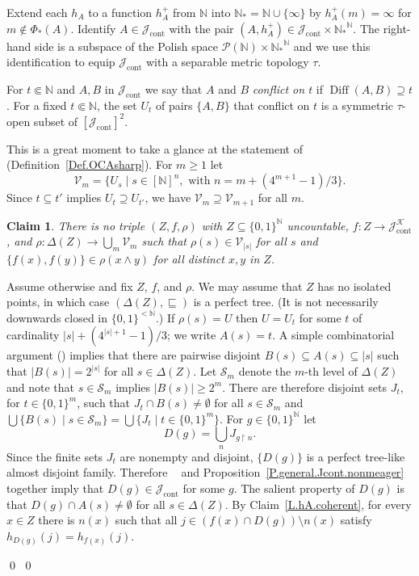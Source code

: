 \documentclass{amsart}
\makeatletter
\def\N{\mathbb N}                        %
\def\rs{\restriction}
\def\text{\mbox}
\newtheorem{claim}{Claim}
\theoremstyle{definition}
\theoremstyle{remark}
\def\twolo{\{0,1\}^{<\N}}
\def\twoo{\{0,1\}^{\N}}
\DeclareMathOperator{\Ccont}{cont}
\newcommand{\Jcont}{\cJ_{\Ccont}}
\newcommand{\cK}{{\mathcal K}}
\renewcommand{\proofname}{Proof}
\renewenvironment{proof}[1][\proofname]{\par
\let\oldqedsymbol\qedsymbol             %
  \normalfont
  \topsep6\p@\@plus6\p@ \trivlist
  \item[\hskip\labelsep\hskip\parindent\scshape
    #1\@addpunct{.}]\ignorespaces
}{%
  \qed\endtrivlist
\global\let\qedsymbol\oldqedsymbol      %
}
\newcommand{\cP}{\mathcal P}
\newcommand{\bbN}{\mathbb N}
\newcommand{\cJ}{{\mathcal J}} %
\newcommand{\cV}{\mathcal V}
\DeclareMathOperator{\OCAT}{OCA_T}
\DeclareMathOperator{\OCAsharp}{OCA^\#}
\newcommand{\cS}{\mathcal S}
\DeclareMathOperator{\Diff}{Diff}
\numberwithin{claim}{subsection}
\makeatother
\begin{document}
\begin{proof}[Proof of Theorem~\ref{T.OCAsharp-Fin}]
	
	Extend each $h_A$ to a function $h_A^+$ from $\bbN$ into $\bbN_*=\bbN\cup \{\infty\}$ by $h_A^+(m)=\infty$ for $m\notin \Phi_*(A)$. 
	Identify $A\in \Jcont$ with the pair $(A,h_A^+)\in\Jcont\times {\bbN_*}^\bbN$. The right-hand side is a subspace of the Polish space $\cP(\bbN)\times {\bbN_*}^\bbN$ and we use this identification to equip $\Jcont$ with a separable metric topology $\tau$. 
	
	
	For $t\Subset \bbN$ and $A,B$ in $\Jcont$ we say that $A$ and $B$ \emph{conflict on $t$} if $\Diff(A,B)\supseteq t$. For a fixed $t\Subset \bbN$, the set $U_t$ of pairs $\{A,B\}$ that conflict on $t$ is a symmetric $\tau$-open subset of $[\Jcont]^2$. 
	
This is a great moment to take a glance at the statement of $\OCAsharp$ (Definition~\ref{Def.OCAsharp}).
	For $m\geq 1$ let 
	\[
	\cV_m=\{U_s\mid s\in [\bbN]^{n}, \text{ with } n=m+(4^{m+1}-1)/3\}.
	\]  
	Since $t\subseteq t'$ implies $U_t\supseteq U_{t'}$, we have $\cV_m\supseteq \cV_{m+1}$ for all $m$. 
	
	
	\begin{claim}\label{C.no-triple}
		There is no triple $(Z,f,\rho)$ with $Z\subseteq \twoo$ uncountable, $f\colon Z\to \Jcont^\cK$,  and $\rho\colon \Delta(Z)\to \bigcup_m \cV_m$ such that $\rho(s)\in \cV_{|s|}$ for all $s$ and 
		\(
		\{f(x),f(y)\}\in \rho(x\wedge y)
		\)
		for all distinct $x,y$ in $Z$. 
	\end{claim}
	\begin{proof}
		Assume otherwise and fix $Z$, $f$, and $\rho$.  We may assume that $Z$ has no isolated points, in which case $(\Delta(Z),\sqsubseteq)$ is a perfect tree. (It is not necessarily downwards closed in $\twolo$.) If $\rho(s)=U$ then $U=U_t$ for some $t$ of cardinality $|s|+(4^{|s|+1}-1)/3$; we write $A(s)=t$. A simple combinatorial argument  (\cite[Lemma~3.8]{de2023trivial})  implies that there are pairwise disjoint  $B(s)\subseteq A(s)\subseteq |s|$ such that $|B(s)|=2^{|s|}$ for all $s\in \Delta(Z)$.  Let $\cS_m$ denote the $m$-th level of $\Delta(Z)$ and note that $s\in \cS_m$  implies $|B(s)|\geq 2^m$. There are therefore disjoint sets $J_t$, for $t\in \{0,1\}^m$, such that $J_t\cap B(s)\neq \emptyset$ for all $s\in \cS_m$  and $\bigcup\{B(s)\mid s\in \cS_m\}=\bigcup\{J_t\mid t\in \{0,1\}^m\}$. For $g\in \twoo$ let 
		\[
		D(g)=\bigcup_n J_{g\rs n}.  
		\]
		Since the finite sets $J_t$ are nonempty and disjoint, $\{D(g)\}$ is a perfect tree-like almost disjoint family. Therefore $\OCAT$ and Proposition~\ref{P.general.Jcont.nonmeager} together imply that $D(g)\in \Jcont$ for some $g$. The salient property of $D(g)$ is that $D(g)\cap A(s)\neq \emptyset$ for all $s\in \Delta(Z)$. By Claim~\ref{L.hA.coherent}, for every $x\in Z$ there is $n(x)$ such that all $j\in (f(x)\cap D(g))\setminus n(x)$  satisfy $h_{D(g)}(j)=h_{f(x)}(j)$. 
		

\end{proof}
\end{proof}
\end{document}

